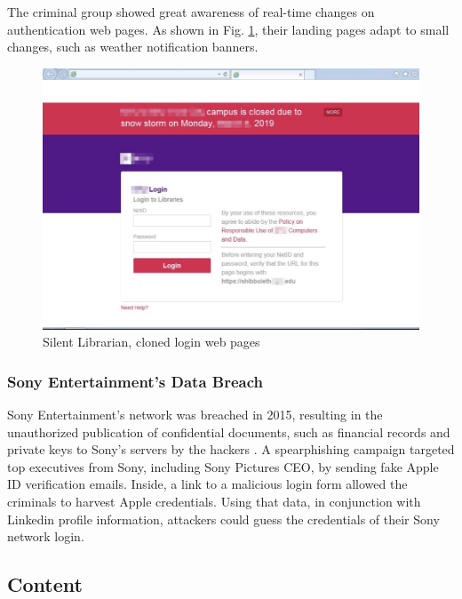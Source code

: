 \documentclass[a4paper]{article}
\begin{document}
\noindent
The criminal group showed great awareness of real-time changes on authentication web pages. As shown in Fig. \ref{sil-lib-landing}, their landing pages adapt to small changes, such as weather notification banners.

\smallskip

\begin{figure}[ht!]
\centering
\includegraphics[scale=0.58]{images/reports/silent-librarian-portal.PNG}
\caption{Silent Librarian, cloned login web pages \cite{article-silent-librarian}}
\label{sil-lib-landing}
\end{figure}

\newpage

\subsubsection{Sony Entertainment's Data Breach}

Sony Entertainment's network was breached in 2015, resulting in the unauthorized publication of confidential documents, such as financial records and private keys to Sony's servers by the hackers \cite{article-sony-breach}. A spearphishing campaign targeted top executives from Sony, including Sony Pictures CEO, by sending fake Apple ID verification emails. Inside, a link to a malicious login form allowed the criminals to harvest Apple credentials. Using that data, in conjunction with Linkedin profile information, attackers could guess the credentials of their Sony network login.

\subsection{Content}
\end{document}
